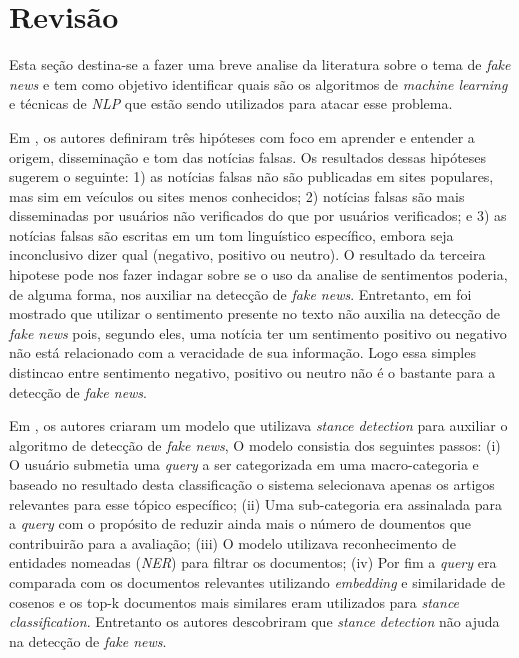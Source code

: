 \section{Revisão}



Esta seção destina-se a fazer uma breve analise da literatura sobre o tema de \textit{fake news} e tem como objetivo identificar quais são os algoritmos de \textit{machine learning} e técnicas de \textit{NLP} que estão sendo utilizados para atacar esse problema.

Em \citet{parikh2019}, os autores definiram três hipóteses com foco em aprender e entender a origem, disseminação e tom das notícias falsas. Os resultados dessas hipóteses sugerem o seguinte: 1) as notícias falsas não são publicadas em sites populares, mas sim em veículos ou sites menos conhecidos; 2) notícias falsas são mais disseminadas por usuários não verificados do que por usuários verificados; e 3) as notícias falsas são escritas em um tom linguístico específico, embora seja inconclusivo dizer qual (negativo, positivo ou neutro). O resultado da terceira hipotese pode nos fazer indagar sobre se o uso da analise de sentimentos poderia, de alguma forma, nos auxiliar na detecção de \textit{fake news}. Entretanto, em \citet{baarir2020} foi mostrado que utilizar o sentimento presente no texto não auxilia na detecção de \textit{fake news} pois, segundo eles, uma notícia ter um sentimento positivo ou negativo não está relacionado com a veracidade de sua informação. Logo essa simples distincao entre sentimento negativo, positivo ou neutro não é o bastante para a detecção de \textit{fake news}.


Em \citet{DeMagistris2022}, os autores criaram um modelo que utilizava \textit{stance detection} para auxiliar o algoritmo de detecção de \textit{fake news}, O modelo consistia dos seguintes passos: (i) O usuário submetia uma \textit{query} a ser categorizada em uma macro-categoria e baseado no resultado desta classificação o sistema selecionava apenas os artigos relevantes para esse tópico específico; (ii) Uma sub-categoria era assinalada para a \textit{query} com o propósito de reduzir ainda mais o número de doumentos que contribuirão para a avaliação; (iii) O modelo utilizava reconhecimento de entidades nomeadas (\textit{NER}) para filtrar os documentos; (iv) Por fim a \textit{query} era comparada com os documentos relevantes utilizando \textit{embedding} e similaridade de cosenos e os top-k documentos mais similares eram utilizados para \textit{stance classification}. Entretanto os autores descobriram que \textit{stance detection} não ajuda na detecção de \textit{fake news}.

